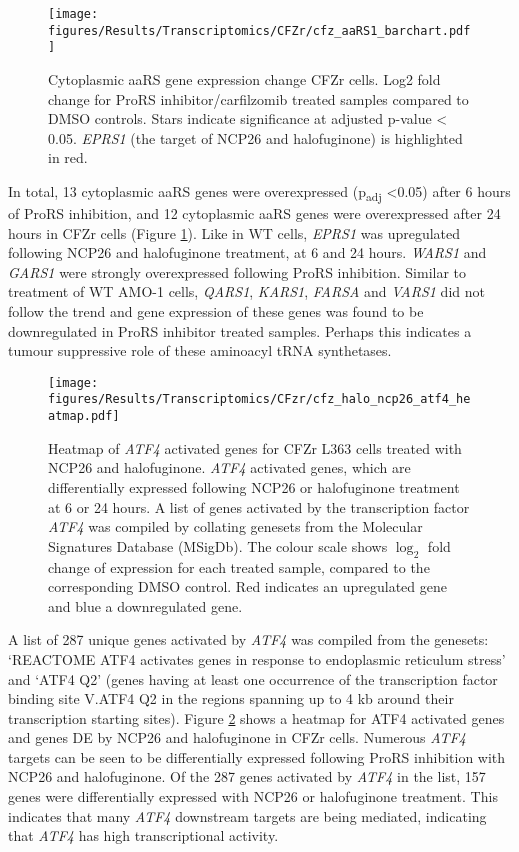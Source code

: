 \begin{figure}[htb]
\centering
\texttt{[image: figures/Results/Transcriptomics/CFZr/cfz\_aaRS1\_barchart.pdf]}
\caption[Cytoplasmic aaRS gene expression change- CFZr cells]{Cytoplasmic aaRS gene expression change CFZr cells.
Log2 fold change for ProRS inhibitor/carfilzomib treated samples compared to DMSO controls.
Stars indicate significance at adjusted p-value < 0.05.
\textit{EPRS1} (the target of NCP26 and halofuginone) is highlighted in red.
}
\label{fig:cfz_ARS1}
\end{figure}
In total, 13 cytoplasmic aaRS genes were overexpressed (p\textsubscript{adj} <0.05) after 6 hours of ProRS inhibition, and 12 cytoplasmic aaRS genes were overexpressed after 24 hours in CFZr cells (Figure \ref{fig:cfz_ARS1}).
Like in WT cells, \textit{EPRS1} was upregulated following NCP26 and halofuginone treatment, at 6 and 24 hours.
\textit{WARS1} and \textit{GARS1} were strongly overexpressed following ProRS inhibition.
Similar to treatment of WT AMO-1 cells, \textit{QARS1}, \textit{KARS1}, \textit{FARSA} and \textit{VARS1} did not follow the trend and gene expression of these genes was found to be downregulated in ProRS inhibitor treated samples.
Perhaps this indicates a tumour suppressive role of these aminoacyl tRNA synthetases.

\begin{figure}[p]
\centering
\texttt{[image: figures/Results/Transcriptomics/CFzr/cfz\_halo\_ncp26\_atf4\_heatmap.pdf]}
\caption[Heatmap of \textit{ATF4} activated genes for ProRS treated CFZr cells]{Heatmap of \textit{ATF4} activated genes for CFZr L363 cells treated with NCP26 and halofuginone.
\textit{ATF4} activated genes, which are differentially expressed following NCP26 or halofuginone treatment at 6 or 24 hours.
A list of genes activated by the transcription factor \textit{ATF4} was compiled by collating genesets from the Molecular Signatures Database (MSigDb).
The colour scale shows $\log_{2}$ fold change of expression for each treated sample, compared to the corresponding DMSO control.
Red indicates an upregulated gene and blue a downregulated gene.
}
\label{fig:cfz_atf4_heatmap}
\end{figure}

A list of 287 unique genes activated by \textit{ATF4} was compiled from the genesets: `REACTOME ATF4 activates genes in response to endoplasmic reticulum stress' and `ATF4 Q2' (genes having at least one occurrence of the transcription factor binding site V.ATF4 Q2 in the regions spanning up to 4 kb around their transcription starting sites).
Figure \ref{fig:cfz_atf4_heatmap} shows a heatmap for ATF4 activated genes and genes DE by NCP26 and halofuginone in CFZr cells.
Numerous \textit{ATF4} targets can be seen to be differentially expressed following ProRS inhibition with NCP26 and halofuginone.
Of the 287 genes activated by \textit{ATF4} in the list, 157 genes were differentially expressed with NCP26 or halofuginone treatment.
This indicates that many \textit{ATF4} downstream targets are being mediated, indicating that \textit{ATF4} has high transcriptional activity.

